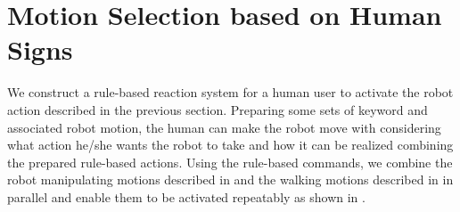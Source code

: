 \section{Motion Selection based on Human Signs}
\label{sec:aural}
We construct a rule-based reaction system for a human user to activate the robot action described in the previous section. Preparing some sets of keyword and associated robot motion, the human can make the robot move with considering what action he/she wants the robot to take and how it can be realized combining the prepared rule-based actions.
Using the rule-based commands, we combine the robot manipulating motions described in  and the walking motions described in  in parallel and enable them to be activated repeatably as shown in .


